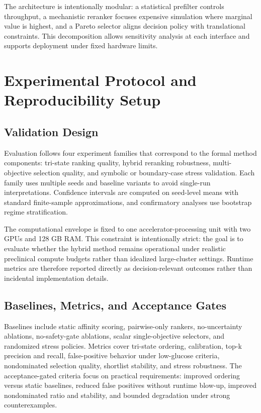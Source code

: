 \documentclass{article} %
\begin{document}
The architecture is intentionally modular: a statistical prefilter controls throughput, a mechanistic reranker focuses expensive simulation where marginal value is highest, and a Pareto selector aligns decision policy with translational constraints. This decomposition allows sensitivity analysis at each interface and supports deployment under fixed hardware limits.

\section{Experimental Protocol and Reproducibility Setup}
\label{sec:experiments}
\subsection{Validation Design}
Evaluation follows four experiment families that correspond to the formal method components: tri-state ranking quality, hybrid reranking robustness, multi-objective selection quality, and symbolic or boundary-case stress validation. Each family uses multiple seeds and baseline variants to avoid single-run interpretations. Confidence intervals are computed on seed-level means with standard finite-sample approximations, and confirmatory analyses use bootstrap regime stratification.

The computational envelope is fixed to one accelerator-processing unit with two GPUs and 128 GB RAM. This constraint is intentionally strict: the goal is to evaluate whether the hybrid method remains operational under realistic preclinical compute budgets rather than idealized large-cluster settings. Runtime metrics are therefore reported directly as decision-relevant outcomes rather than incidental implementation details.

\subsection{Baselines, Metrics, and Acceptance Gates}
Baselines include static affinity scoring, pairwise-only rankers, no-uncertainty ablations, no-safety-gate ablations, scalar single-objective selectors, and randomized stress policies. Metrics cover tri-state ordering, calibration, top-k precision and recall, false-positive behavior under low-glucose criteria, nondominated selection quality, shortlist stability, and stress robustness. The acceptance-gated criteria focus on practical requirements: improved ordering versus static baselines, reduced false positives without runtime blow-up, improved nondominated ratio and stability, and bounded degradation under strong counterexamples.
\end{document}
